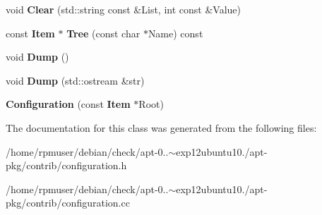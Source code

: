 \begin{DoxyCompactItemize}
\item 
void {\bfseries \-Clear} (std\-::string const \&\-List, int const \&\-Value)\label{classConfiguration_a2c9d5bbe2426dd5fa2b38f7323d70cd8}

\item 
const {\bf \-Item} $\ast$ {\bfseries \-Tree} (const char $\ast$\-Name) const \label{classConfiguration_a48f29adb8ef9215ae99ff0fb25498712}

\item 
void {\bfseries \-Dump} ()\label{classConfiguration_a793169e06e9183e678805ce0663b6000}

\item 
void {\bfseries \-Dump} (std\-::ostream \&str)\label{classConfiguration_a70b2730c72d8c133ff3acca2fd366d59}

\item 
{\bfseries \-Configuration} (const {\bf \-Item} $\ast$\-Root)\label{classConfiguration_aa7589283aa8058ca4c15e27bcff331aa}

\end{DoxyCompactItemize}


\-The documentation for this class was generated from the following files\-:\begin{DoxyCompactItemize}
\item 
/home/rpmuser/debian/check/apt-\/0..$\sim$exp12ubuntu10./apt-\/pkg/contrib/configuration.\-h\item 
/home/rpmuser/debian/check/apt-\/0..$\sim$exp12ubuntu10./apt-\/pkg/contrib/configuration.\-cc\end{DoxyCompactItemize}
